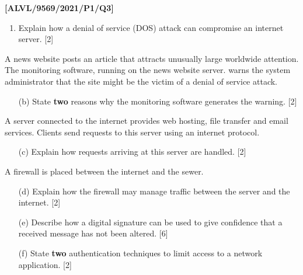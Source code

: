 \item \textbf{{[}ALVL/9569/2021/P1/Q3{]} }
\begin{enumerate}
\item Explain how a denial of service (DOS) attack can compromise an internet
server. \hfill{}{[}2{]}
\end{enumerate}
A news website posts an article that attracts unusually large worldwide
attention. The monitoring software, running on the news website server.
warns the system administrator that the site might be the victim of
a denial of service attack.
\begin{enumerate}
\item[(b)]  State \textbf{two} reasons why the monitoring software generates
the warning. \hfill{} {[}2{]}
\end{enumerate}
A server connected to the internet provides web hosting, file transfer
and email services. Clients send requests to this server using an
internet protocol.
\begin{enumerate}
\item[(c)]  Explain how requests arriving at this server are handled. \hfill{}{[}2{]}
\end{enumerate}
A firewall is placed between the internet and the sewer.
\begin{enumerate}
\item[(d)]  Explain how the firewall may manage traffic between the server and
the internet. \hfill{}{[}2{]}
\item[(e)]  Describe how a digital signature can be used to give confidence
that a received message has not been altered. \hfill{} {[}6{]}
\item[(f)]  State \textbf{two} authentication techniques to limit access to
a network application. \hfill{}{[}2{]}
\end{enumerate}